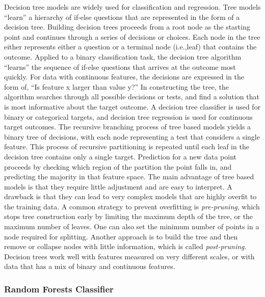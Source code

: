 \documentclass[sigconf]{acmart}
\begin{document}
Decision tree models are widely used for classification and regression. Tree 
models ``learn'' a hierarchy of if-else questions that are represented in the
form of a decision tree. Building decision trees proceeds from a root node as 
the starting point and continues through a series of decisions or choices.
Each node in the tree either represents either a question or a terminal node 
(i.e.,leaf) that contains the outcome. Applied to a binary classification task, 
the decision tree algorithm ``learns'' the sequence of if-else questions that 
arrives at the outcome most quickly. For data with continuous features, the 
decisions are expressed in the form of, ``Is feature x larger than value y?''
\cite{muller17} In constructing the tree, the algorithm searches through all
possible decisions or tests, and find a solution that is most informative 
about the target outcome. A decision tree classifier is used for binary or 
categorical targets, and decision tree regression is used for continuous
target outcomes. The recursive branching process of tree based models yields
a binary tree of decisions, with each node representing a test that considers
a single feature. This process of recursive partitioning is repeated until
each leaf in the decision tree contains only a single target. Prediction for
a new data point proceeds by checking which region of the partition the 
point falls in, and predicting the majority in that feature space. The 
main advantage of tree based models is that they require little adjustment 
and are easy to interpret. A drawback is that they can lead to very complex
models that are highly overfit to the training data. A common strategy to 
prevent overfitting is \emph{pre-pruning}, which stops tree construction 
early by limiting the maximum depth of the tree, or the maximum number of 
leaves. One can also set the minimum number of points in a node required for 
splitting. Another approach is to build the tree and then remove or collapse 
nodes with little information, which is called \emph{post-pruning}. Decision
trees work well with features measured on very different scales, or with 
data that has a mix of binary and continuous features. 

\subsubsection{Random Forests Classifier}
\end{document}
